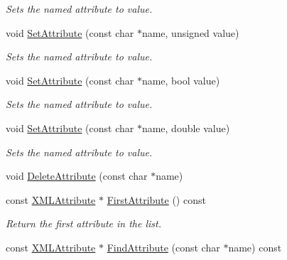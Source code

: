 \begin{DoxyCompactItemize}
\begin{DoxyCompactList}\small\item\em Sets the named attribute to value. \end{DoxyCompactList}\item 
\hypertarget{classtinyxml2_1_1_x_m_l_element_ae143997e90064ba82326b29a9930ea8f}{void \hyperlink{classtinyxml2_1_1_x_m_l_element_ae143997e90064ba82326b29a9930ea8f}{Set\-Attribute} (const char $\ast$name, unsigned value)}\label{classtinyxml2_1_1_x_m_l_element_ae143997e90064ba82326b29a9930ea8f}

\begin{DoxyCompactList}\small\item\em Sets the named attribute to value. \end{DoxyCompactList}\item 
\hypertarget{classtinyxml2_1_1_x_m_l_element_aa848b696e6a75e4e545c6da9893b11e1}{void \hyperlink{classtinyxml2_1_1_x_m_l_element_aa848b696e6a75e4e545c6da9893b11e1}{Set\-Attribute} (const char $\ast$name, bool value)}\label{classtinyxml2_1_1_x_m_l_element_aa848b696e6a75e4e545c6da9893b11e1}

\begin{DoxyCompactList}\small\item\em Sets the named attribute to value. \end{DoxyCompactList}\item 
\hypertarget{classtinyxml2_1_1_x_m_l_element_a233397ee81e70eb5d4b814c5f8698533}{void \hyperlink{classtinyxml2_1_1_x_m_l_element_a233397ee81e70eb5d4b814c5f8698533}{Set\-Attribute} (const char $\ast$name, double value)}\label{classtinyxml2_1_1_x_m_l_element_a233397ee81e70eb5d4b814c5f8698533}

\begin{DoxyCompactList}\small\item\em Sets the named attribute to value. \end{DoxyCompactList}\item 
void \hyperlink{classtinyxml2_1_1_x_m_l_element_aebd45aa7118964c30b32fe12e944628a}{Delete\-Attribute} (const char $\ast$name)
\item 
\hypertarget{classtinyxml2_1_1_x_m_l_element_a67593e63558ffda0386699c3e4cc0b2c}{const \hyperlink{classtinyxml2_1_1_x_m_l_attribute}{X\-M\-L\-Attribute} $\ast$ \hyperlink{classtinyxml2_1_1_x_m_l_element_a67593e63558ffda0386699c3e4cc0b2c}{First\-Attribute} () const }\label{classtinyxml2_1_1_x_m_l_element_a67593e63558ffda0386699c3e4cc0b2c}

\begin{DoxyCompactList}\small\item\em Return the first attribute in the list. \end{DoxyCompactList}\item 
\hypertarget{classtinyxml2_1_1_x_m_l_element_aaf46b0799ea419e5d070ac9a357de48f}{const \hyperlink{classtinyxml2_1_1_x_m_l_attribute}{X\-M\-L\-Attribute} $\ast$ \hyperlink{classtinyxml2_1_1_x_m_l_element_aaf46b0799ea419e5d070ac9a357de48f}{Find\-Attribute} (const char $\ast$name) const }\label{classtinyxml2_1_1_x_m_l_element_aaf46b0799ea419e5d070ac9a357de48f}


\end{DoxyCompactItemize}
